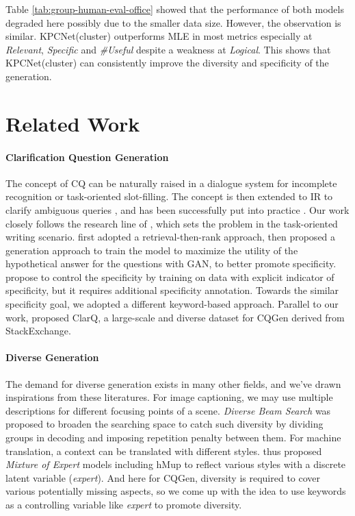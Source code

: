 \documentclass[letterpaper]{article} %
\begin{document}
Table \ref{tab:group-human-eval-office} showed that the performance of both models degraded here possibly due to the smaller data size. However, the observation is similar. KPCNet(cluster) outperforms MLE in most metrics especially at \textit{Relevant}, \textit{Specific} and \textit{\#Useful} despite a weakness at \textit{Logical}. This shows that KPCNet(cluster) can consistently improve the diversity and specificity of the generation.


\section{Related Work}
\paragraph{Clarification Question Generation} The concept of CQ can be naturally raised in a dialogue system for incomplete recognition \citep{stoyanchev2014towards} or task-oriented slot-filling. The concept is then extended to IR to clarify ambiguous queries \citep{aliannejadi2019asking}, and has been successfully put into practice \citep{Zamani2020GeneratingCQ}. Our work closely follows the research line of \citet{rao2018learning, rao2019answer, cao2019controlling}, which sets the problem in the task-oriented writing scenario. \citet{rao2018learning} first adopted a retrieval-then-rank approach, \citet{rao2019answer} then proposed a generation approach to train the model to maximize the utility of the hypothetical answer for the questions with GAN, to better promote specificity. \citet{cao2019controlling} propose to control the specificity by training on data with explicit indicator of specificity, but it requires additional specificity annotation. Towards the similar specificity goal, we adopted a different keyword-based approach. Parallel to our work, \citet{Kumar_2020} proposed ClarQ, a large-scale and diverse dataset for CQGen derived from StackExchange.

\paragraph{Diverse Generation} The demand for diverse generation exists in many other fields, and we've drawn inspirations from these literatures. For image captioning, we may use multiple descriptions for different focusing points of a scene. \textit{Diverse Beam Search} \citep{vijayakumar2018diverse} was proposed to broaden the searching space to catch such diversity by dividing groups in decoding and imposing repetition penalty between them. For machine translation, a context can be translated with different styles. \citet{shen2019mixture} thus proposed \textit{Mixture of Expert} models including hMup to reflect various styles with a discrete latent variable (\textit{expert}). And here for CQGen, diversity is required to cover various potentially missing aspects, so we come up with the idea to use keywords as a controlling variable  like \textit{expert} to promote diversity.
\end{document}
